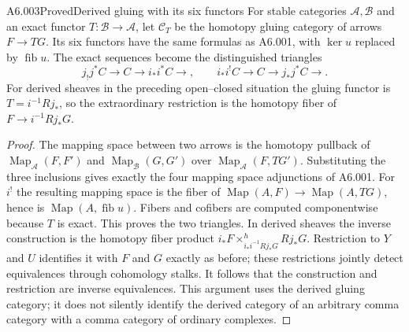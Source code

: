\begin{saresult}{A6.003}{Proved}{Derived gluing with its six functors}
For stable categories $\mathcal A,\mathcal B$ and an exact functor
$T:\mathcal B\to\mathcal A$, let $\mathcal C_T$ be the homotopy
gluing category of arrows $F\to TG$. Its six functors have the same
formulas as A6.001, with $\ker u$ replaced by $\operatorname{fib}u$.
The exact sequences become the distinguished triangles
\[
j_!j^*C\longrightarrow C\longrightarrow i_*i^*C\longrightarrow,
\qquad
i_*i^!C\longrightarrow C\longrightarrow j_*j^*C\longrightarrow.
\]
For derived sheaves in the preceding open--closed situation the
gluing functor is $T=i^{-1}Rj_*$, so the extraordinary restriction
is the homotopy fiber of $F\to i^{-1}Rj_*G$.
\end{saresult}
\begin{proof}
The mapping space between two arrows is the homotopy pullback
of $\operatorname{Map}_{\mathcal A}(F,F')$ and
$\operatorname{Map}_{\mathcal B}(G,G')$ over
$\operatorname{Map}_{\mathcal A}(F,TG')$.
Substituting the three inclusions gives exactly the four mapping
space adjunctions of A6.001. For $i^!$ the resulting mapping space
is the fiber of
$\operatorname{Map}(A,F)\to\operatorname{Map}(A,TG)$, hence is
$\operatorname{Map}(A,\operatorname{fib}u)$.
Fibers and cofibers are computed componentwise because $T$ is exact.
This proves the two triangles. In derived sheaves the inverse
construction is the homotopy fiber product
$i_*F\times^h_{i_*i^{-1}Rj_*G}Rj_*G$.
Restriction to $Y$ and $U$ identifies it with $F$ and $G$ exactly
as before; these restrictions jointly detect equivalences through
cohomology stalks. It follows that the construction and restriction
are inverse equivalences. This argument uses the derived gluing
category; it does not silently identify the derived category of an
arbitrary comma category with a comma category of ordinary complexes.
\end{proof}


